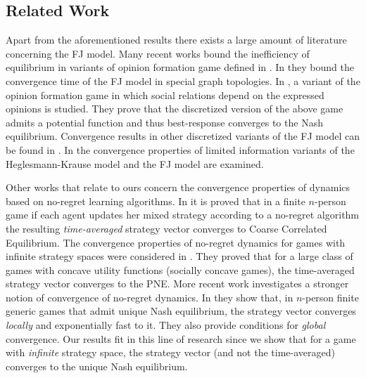 \subsection{Related Work}

Apart from the aforementioned results there exists a large amount of literature
concerning the FJ model.  Many recent works \cite{BGM13,CKO13,BFM16,EFHS17}
bound the inefficiency of equilibrium in variants of opinion formation game
defined in \cite{BKO11}. In \cite{GS14} they bound the convergence time of
the FJ model in special graph topologies.  In \cite{BFM16}, a variant of the
opinion formation game in which social relations depend on the expressed
opinions is studied.  They prove that the discretized version of the above
game admits a potential function and thus best-response converges to the Nash
equilibrium. Convergence results in other discretized variants of the FJ model
can be found in \cite{YOASS13,FGV16}. In \cite{FPS16} the convergence
properties of limited information variants of the Heglesmann-Krause model
\cite{HK} and the FJ model are examined.

Other works that relate to ours concern the convergence properties of
dynamics based on no-regret learning algorithms.  In
\cite{FV97,FS99,SA00,SALS15} it is proved that in a finite $n$-person game if
each agent updates her mixed strategy according to a no-regret algorithm the
resulting \emph{time-averaged} strategy vector converges to Coarse Correlated
Equilibrium. The convergence properties of no-regret dynamics for games with
infinite strategy spaces were considered in \cite{EMN09}.  They proved that for
a large class of games with concave utility functions (socially concave games),
the time-averaged strategy vector converges to the PNE. More recent work
investigates a stronger notion of convergence of no-regret dynamics. In
\cite{CHM17} they show that, in $n$-person finite generic games that admit
unique Nash equilibrium, the strategy vector converges \emph{locally} and
exponentially fast to it. They also provide conditions for \emph{global}
convergence.  Our results fit in this line of research since we show that for a
game with \emph{infinite} strategy space, the strategy vector (and not the
time-averaged) converges to the unique Nash equilibrium.

